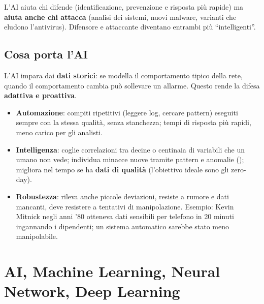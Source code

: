 \begin{attenzione}
L'AI aiuta chi difende (identificazione, prevenzione e risposta più rapide) ma \textbf{aiuta anche
chi attacca} (analisi dei sistemi, nuovi malware, varianti che eludono l'antivirus). Difensore e
attaccante diventano entrambi più ``intelligenti''.
\end{attenzione}

\subsection{Cosa porta l'AI}
L'AI impara dai \textbf{dati storici}: se modella il comportamento tipico della rete, quando il
comportamento cambia può sollevare un allarme. Questo rende la difesa \textbf{adattiva e proattiva}.
\begin{itemize}
  \item \textbf{Automazione}: compiti ripetitivi (leggere log, cercare pattern) eseguiti sempre con
        la stessa qualità, senza stanchezza; tempi di risposta più rapidi, meno carico per gli analisti.
  \item \textbf{Intelligenza}: coglie correlazioni tra decine o centinaia di variabili che un umano non
        vede; individua minacce nuove tramite pattern e anomalie (); migliora nel tempo
        se ha \textbf{dati di qualità} (l'obiettivo ideale sono gli zero-day).
  \item \textbf{Robustezza}: rileva anche piccole deviazioni, resiste a rumore e dati mancanti, deve resistere
        a tentativi di manipolazione. Esempio: Kevin Mitnick negli anni '80 otteneva dati sensibili per telefono
        in 20 minuti ingannando i dipendenti; un sistema automatico sarebbe stato meno manipolabile.
\end{itemize}

\section{AI, Machine Learning, Neural Network, Deep Learning}
\begin{center}
\end{center}

